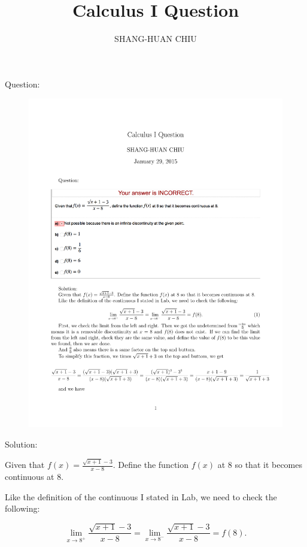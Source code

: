 \documentclass[12pt]{article}
\begin{document}
\title{\Large Calculus I Question}
\author{SHANG-HUAN CHIU}
\maketitle

Question:
\begin{figure}[H]
       \centering       
               \includegraphics[width=\textwidth]{1431_Question_1}
\end{figure}
Solution:

Given that $f(x)=\frac{\sqrt{x+1}-3}{x-8}$. Define the function $f(x)$ at $8$ so that it becomes continuous at $8$.

Like the definition of the continuous I stated in Lab, we need to check the following:

\begin{equation}\label{def}
\lim_{x \to 8^+}\frac{\sqrt{x+1}-3}{x-8}=\lim_{x \to 8^-}\frac{\sqrt{x+1}-3}{x-8}=f(8).
\end{equation}
\end{document}
